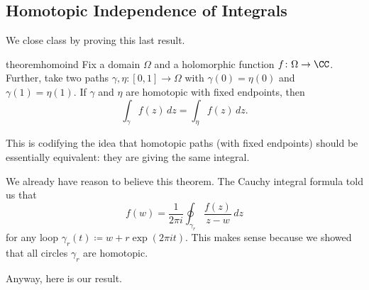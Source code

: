 \documentclass[../notes.tex]{subfiles}
\begin{document}
\subsection{Homotopic Independence of Integrals}
We close class by proving this last result.
\begin{restatable}{theorem}{homoind} \label{thm:homoind}
	Fix a domain $\Omega$ and a holomorphic function $f\colon \Omega\to\CC$. Further, take two paths $\gamma,\eta\colon [0,1]\to\Omega$ with $\gamma(0)=\eta(0)$ and $\gamma(1)=\eta(1)$. If $\gamma$ and $\eta$ are homotopic with fixed endpoints, then
	\[\int_\gamma f(z)\,dz=\int_\eta f(z)\,dz.\]
\end{restatable}
This is codifying the idea that homotopic paths (with fixed endpoints) should be essentially equivalent: they are giving the same integral.
\begin{example}
	We already have reason to believe this theorem. The Cauchy integral formula told us that
	\[f(w)=\frac1{2\pi i}\oint_{\gamma_r}\frac{f(z)}{z-w}\,dz\]
	for any loop $\gamma_r(t)\coloneqq w+r\exp(2\pi it)$. This makes sense because we showed that all circles $\gamma_r$ are homotopic.
\end{example}
Anyway, here is our result.
\end{document}
